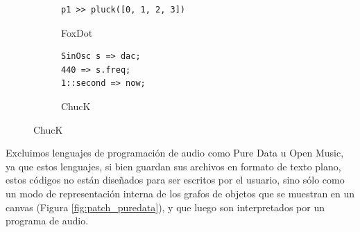 \begin{figure}[h]
    \vspace{5mm} %
    
    \begin{subfigure}{.48\textwidth}
      \centering
      \begin{mdframed}
      \begin{verbatim}
p1 >> pluck([0, 1, 2, 3])
      \end{verbatim}
      \end{mdframed}
      \caption{FoxDot}
    \end{subfigure}\hfill
    \begin{subfigure}{.48\textwidth}
      \centering
      \begin{mdframed}
      \begin{verbatim}
SinOsc s => dac;
440 => s.freq;
1::second => now;
      \end{verbatim}
      \end{mdframed}
      \caption{ChucK}
    \end{subfigure}

    \label{fig:hola_mundo}
\end{figure}

Excluimos lenguajes de programación de audio como Pure Data u Open Music, ya que estos lenguajes, si bien guardan sus archivos en formato de texto plano, estos códigos no están diseñados para ser escritos por el usuario, sino sólo como un modo de representación interna de los grafos de objetos que se muestran en un canvas (Figura \ref{fig:patch_puredata}), y que luego son interpretados por un programa de audio. 

